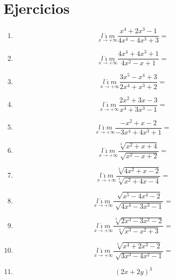 \documentclass[oneside,spanish,letter]{article}
\begin{document}
\section{Ejercicios}
\begin{enumerate}
 \item $$\underset{x\rightarrow +\infty}{l\acute{\imath}m} \frac{x^4+2x^3-1}{4x^4-4x^3+3}=$$
 \item $$\underset{x\rightarrow +\infty}{l\acute{\imath}m} \frac{4x^4+4x^3+1}{4x^2-x+1}=$$
 \item $$\underset{x\rightarrow +\infty}{l\acute{\imath}m} \frac{3x^5-x^4+3}{2x^4+x^3+2}=$$
 \item $$\underset{x\rightarrow +\infty}{l\acute{\imath}m} \frac{2x^2+3x-3}{x^4+3x^3-1}=$$
 \item $$\underset{x\rightarrow +\infty}{l\acute{\imath}m} \frac{-x^2+x-2}{-3x^4+4x^3+1}=$$
 \item $$\underset{x\rightarrow +\infty}{l\acute{\imath}m} \frac{\sqrt[4]{x^2+x+4}}{\sqrt[]{x^2-x+2}}=$$
 \item $$\underset{x\rightarrow +\infty}{l\acute{\imath}m} \frac{\sqrt[3]{4x^2+x-2}}{\sqrt[5]{x^2+4x-4}}=$$
 \item $$\underset{x\rightarrow +\infty}{l\acute{\imath}m} \frac{\sqrt[]{x^5-4x^4-2}}{\sqrt[]{4x^4-3x^3-1}}=$$
 \item $$\underset{x\rightarrow +\infty}{l\acute{\imath}m} \frac{\sqrt[5]{2x^3-3x^2-2}}{\sqrt[4]{x^3-x^2+3}}=$$
 \item $$\underset{x\rightarrow +\infty}{l\acute{\imath}m} \frac{\sqrt[5]{x^4+2x^3-2}}{\sqrt[]{3x^3-4x^2-1}}=$$
\item $$(2x+2y)^3$$
 \end{enumerate}
  \newpage
\end{document}
